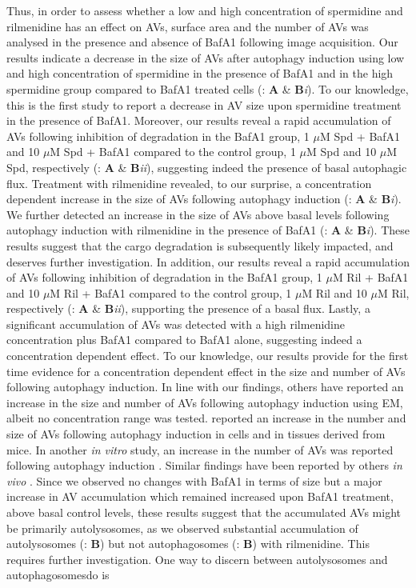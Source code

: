 {Thus, in order to assess whether a low and high concentration of spermidine and rilmenidine has an effect on AVs, surface area and the number of AVs was analysed in the presence and absence of BafA1 following image acquisition. Our results indicate a decrease in the size of AVs after autophagy induction using low and high concentration of spermidine in the presence of BafA1 and in the high spermidine group compared to BafA1 treated cells (: \textbf{A} \& \textbf{B}\textit{i}). To our knowledge, this is the first study to report a decrease in AV size upon spermidine treatment in the presence of BafA1. Moreover, our results reveal a rapid accumulation of AVs following inhibition of degradation in the BafA1 group, 1 $\mu$M Spd + BafA1 and 10 $\mu$M Spd + BafA1 compared to the control group, 1 $\mu$M Spd and 10 $\mu$M Spd, respectively  (: \textbf{A} \& \textbf{B}\textit{ii}), suggesting indeed the presence of basal autophagic flux.  Treatment with rilmenidine revealed, to our surprise, a concentration dependent increase in the size of AVs following autophagy induction (: \textbf{A} \& \textbf{B}\textit{i}). We further detected an increase in the size of AVs above basal levels following autophagy induction with rilmenidine in the presence of BafA1 (: \textbf{A} \& \textbf{B}\textit{i}). These results suggest that the cargo degradation is subsequently likely impacted, and deserves further investigation. In addition, our results reveal a rapid accumulation of AVs following inhibition of degradation in the BafA1 group, 1 $\mu$M Ril + BafA1 and 10 $\mu$M Ril + BafA1 compared to the control group, 1 $\mu$M Ril and 10 $\mu$M Ril, respectively (: \textbf{A} \& \textbf{B}\textit{ii}), supporting the presence of a basal flux. Lastly, a significant accumulation of AVs was detected with a high rilmenidine concentration plus BafA1 compared to BafA1 alone, suggesting indeed a concentration dependent effect.  To our knowledge, our results provide for the first time evidence for a concentration dependent effect in the size and number of AVs following autophagy induction.  In line with our findings, others have reported an increase in the size and number of AVs following autophagy induction using EM, albeit no concentration range was tested. \citet{Mizushima2004a} reported an increase in the number and size of AVs following autophagy induction in cells and in tissues derived from mice. In another \textit{in vitro} study, an increase in the number of AVs was reported  following autophagy induction \citep{Lum2005}. Similar findings have been reported by others \textit{in vivo} \citep{Alirezaei2010,Ericsson1969,Mizushima2004a}. Since we observed no changes with BafA1 in terms of size but a major increase in AV accumulation which remained increased upon BafA1 treatment, above basal control levels, these results suggest that the accumulated AVs might be primarily autolysosomes, as we observed substantial accumulation of autolysosomes (: \textbf{B}) but not autophagosomes (: \textbf{B}) with rilmenidine. This requires further investigation. One way to discern between autolysosomes and autophagosomesdo is }
